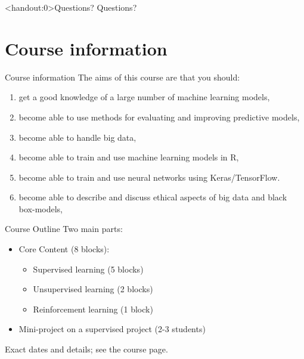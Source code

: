 \documentclass[10pt,handout]{beamer}
\begin{document}
\begin{frame}<handout:0>{Questions?}
Questions?
\end{frame}


\section{Course information}
\frame{\sectionpage}

\begin{frame}{Course information}
The aims of this course are that you should:\\[3mm]\pause
\begin{enumerate}
\item get a good knowledge of a large number of machine learning models,
\item become able to use methods for evaluating and improving predictive models,
\item become able to handle big data,
\item become able to train and use machine learning models in R,
\item become able to train and use neural networks using Keras/TensorFlow.
\item become able to describe and discuss ethical aspects of big data and black box-models,
\end{enumerate}

\end{frame}


\begin{frame}{Course Outline}
Two main parts:
\begin{itemize}
\item Core Content (8 blocks):
\begin{itemize}
\item Supervised learning (5 blocks)
\item Unsupervised learning (2 blocks)
\item Reinforcement learning (1 block)
\end{itemize}
\item Mini-project on a supervised project (2-3 students)\pause
\end{itemize}
Exact dates and details; see the course page.
\end{frame}
\end{document}
